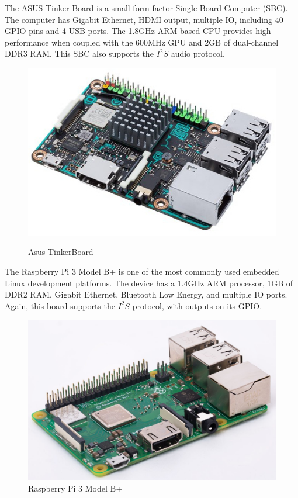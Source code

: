 \documentclass[11pt,a4paper,headinclude=false,footinclude=false]{scrreprt}
\begin{document}
The ASUS Tinker Board is a small form-factor Single Board Computer
(SBC). The computer has Gigabit Ethernet, HDMI output, multiple IO,
including 40 GPIO pins and 4 USB ports. The 1.8GHz ARM based CPU
provides high performance when coupled with the 600MHz GPU and 2GB of
dual-channel DDR3 RAM. This SBC also supports the \(I^2S\) audio
protocol\cite{Tinker18}.

\begin{figure}[H]
\includegraphics{BackgroundLitSurvey/AsusTB.jpeg}
\centering
\caption{Asus TinkerBoard}\cite{Tinker18}
\label{AsusTBFig}
\end{figure}

The Raspberry Pi 3 Model B+ is one of the most commonly used embedded
Linux development platforms. The device has a 1.4GHz ARM processor, 1GB
of DDR2 RAM, Gigabit Ethernet, Bluetooth Low Energy, and multiple IO
ports. Again, this board supports the \(I^2S\) protocol, with outputs on
its GPIO\cite{RPI18}.

\begin{figure}[H]
\includegraphics{BackgroundLitSurvey/Rpi.jpg}
\centering
\caption{Raspberry Pi 3 Model B+\cite{RPI18}}
\label{RPiFig}
\end{figure}
\end{document}
